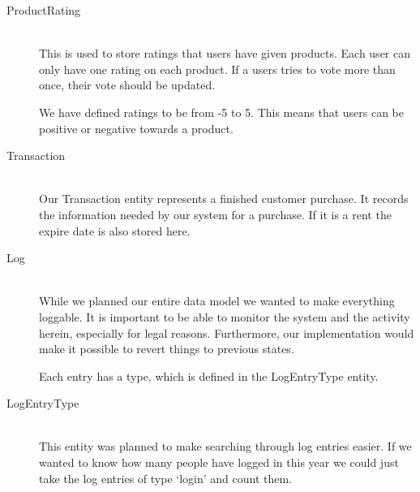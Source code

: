 \begin{description}
\item[ProductRating] \hfill \\
This is used to store ratings that users have given products. Each user can only have one rating on each product. If a users tries to vote more than once, their vote should be updated.

We have defined ratings to be from -5 to 5. This means that users can be positive or negative towards a product.

\item[Transaction] \hfill \\
Our Transaction entity represents a finished customer purchase.  It records the information needed by our system for a purchase. If it is a rent the expire date is also stored here.

\item[Log] \hfill \\
While we planned our entire data model we wanted to make everything loggable. It is important to be able to monitor the system and the activity herein, especially for legal reasons. Furthermore, our implementation would make it possible to revert things to previous states.

Each entry has a type, which is defined in the LogEntryType entity.

\item[LogEntryType] \hfill \\
This entity was planned to make searching through log entries easier. If we wanted to know how many people have logged in this year we could just take the log entries of type `login' and count them.
\end{description}
